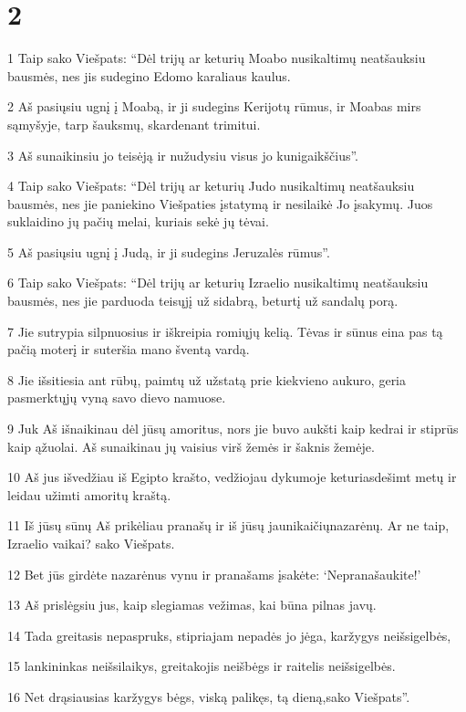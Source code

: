 \chapter{2}


\par 1 Taip sako Viešpats: “Dėl trijų ar keturių Moabo nusikaltimų neatšauksiu bausmės, nes jis sudegino Edomo karaliaus kaulus. 
\par 2 Aš pasiųsiu ugnį į Moabą, ir ji sudegins Kerijotų rūmus, ir Moabas mirs sąmyšyje, tarp šauksmų, skardenant trimitui. 
\par 3 Aš sunaikinsiu jo teisėją ir nužudysiu visus jo kunigaikščius”. 
\par 4 Taip sako Viešpats: “Dėl trijų ar keturių Judo nusikaltimų neatšauksiu bausmės, nes jie paniekino Viešpaties įstatymą ir nesilaikė Jo įsakymų. Juos suklaidino jų pačių melai, kuriais sekė jų tėvai. 
\par 5 Aš pasiųsiu ugnį į Judą, ir ji sudegins Jeruzalės rūmus”. 
\par 6 Taip sako Viešpats: “Dėl trijų ar keturių Izraelio nusikaltimų neatšauksiu bausmės, nes jie parduoda teisųjį už sidabrą, beturtį už sandalų porą. 
\par 7 Jie sutrypia silpnuosius ir iškreipia romiųjų kelią. Tėvas ir sūnus eina pas tą pačią moterį ir suteršia mano šventą vardą. 
\par 8 Jie išsitiesia ant rūbų, paimtų už užstatą prie kiekvieno aukuro, geria pasmerktųjų vyną savo dievo namuose. 
\par 9 Juk Aš išnaikinau dėl jūsų amoritus, nors jie buvo aukšti kaip kedrai ir stiprūs kaip ąžuolai. Aš sunaikinau jų vaisius virš žemės ir šaknis žemėje. 
\par 10 Aš jus išvedžiau iš Egipto krašto, vedžiojau dykumoje keturiasdešimt metų ir leidau užimti amoritų kraštą. 
\par 11 Iš jūsų sūnų Aš prikėliau pranašų ir iš jūsų jaunikaičių­nazarėnų. Ar ne taip, Izraelio vaikai?­ sako Viešpats.­ 
\par 12 Bet jūs girdėte nazarėnus vynu ir pranašams įsakėte: ‘Nepranašaukite!’ 
\par 13 Aš prislėgsiu jus, kaip slegiamas vežimas, kai būna pilnas javų. 
\par 14 Tada greitasis nepaspruks, stipriajam nepadės jo jėga, karžygys neišsigelbės, 
\par 15 lankininkas neišsilaikys, greitakojis neišbėgs ir raitelis neišsigelbės. 
\par 16 Net drąsiausias karžygys bėgs, viską palikęs, tą dieną,­sako Viešpats”.



